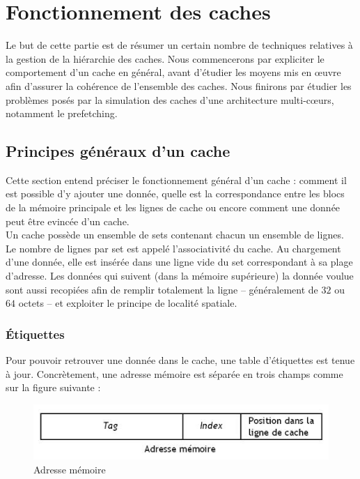 \chapter{Fonctionnement des caches}

Le but de cette partie est de résumer un certain nombre de techniques relatives à la gestion de la hiérarchie des caches. Nous commencerons par expliciter le comportement d'un cache en général, avant d'étudier les moyens mis en {\oe}uvre afin d'assurer la cohérence de l'ensemble des caches. Nous finirons par étudier les problèmes posés par la simulation des caches d'une architecture multi-c{\oe}urs, notamment le prefetching.

\section{Principes généraux d'un cache}
Cette section entend préciser le fonctionnement général d'un cache : comment il est possible d'y ajouter une donnée, quelle est la correspondance entre les blocs de la mémoire principale et les lignes de cache ou encore comment une donnée peut être evincée d'un cache. \\

Un cache possède un ensemble de sets contenant chacun un ensemble de lignes. Le nombre de lignes par set est appelé l'associativité du cache. Au chargement d'une donnée, elle est insérée dans une ligne vide du set correspondant à sa plage d'adresse. Les données qui suivent (dans la mémoire supérieure) la donnée voulue sont aussi recopiées afin de remplir totalement la ligne -- généralement de $32$ ou $64$ octets -- et exploiter le principe de localité spatiale.

\subsection{\'Etiquettes}
Pour pouvoir retrouver une donnée dans le cache, une table d'étiquettes est tenue à jour. Concrètement, une adresse mémoire est séparée en trois champs comme sur la figure suivante : \\

\begin{figure}[!h]
\begin{center}
   \includegraphics[scale=0.50]{etiquette.jpeg}
   \caption{\label{img:etiquette} Adresse mémoire}
\end{center}
\end{figure}

